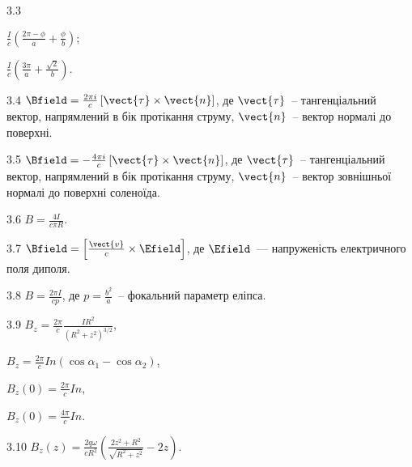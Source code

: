 \protect \section *{\protect {}}
\begin{Solution}{3.{3}}
	\begin{enumerate*}[label = \alph*)]
		\item $\frac{I}{c} \left( \frac{2\pi - \phi}{a}  + \frac{\phi}{b}\right) $;
		\item $\frac{I}{c} \left( \frac{3\pi}{a}  + \frac{\sqrt2}{b}\right) $.
	\end{enumerate*}
\end{Solution}
\begin{Solution}{3.{4}}
	$\Bfield = \frac{2\pi i }{c} \left[ \vect{\tau}\times\vect{n}\right] $, де $\vect{\tau}$~-- тангенціальний вектор, напрямлений в бік протікання струму, $\vect{n}$~-- вектор нормалі до поверхні.
\end{Solution}
\begin{Solution}{3.{5}}
			$\Bfield = - \frac{4\pi i }{c} \left[ \vect{\tau}\times\vect{n}\right] $, де $\vect{\tau}$~-- тангенціальний вектор, напрямлений в бік протікання струму, $\vect{n}$~-- вектор зовнішньої нормалі до поверхні соленоїда.
	
\end{Solution}
\begin{Solution}{3.{6}}
	$B = \frac{4I}{c\pi R}$.
\end{Solution}
\begin{Solution}{3.{7}}
	$\Bfield = \left[ \frac{\vect{v}}{c}\times\Efield\right]  $, де $\Efield$~--- напруженість електричного поля диполя.
\end{Solution}
\begin{Solution}{3.{8}}
	$B = \frac{2\pi I}{cp}$, де $p = \frac{b^2}{a}$~-- фокальний параметр еліпса.
\end{Solution}
\begin{Solution}{3.{9}}
	$B_z = \frac{2\pi}{c}\frac{I R^2}{(R^2 + z^2)^{3/2}}$,
	\begin{enumerate*}[label=\alph*)]
		\item $B_z = \frac{2\pi}{c} In (\cos\alpha_1 - \cos\alpha_2)$,
		\item $B_z(0) = \frac{2\pi}{c} In$,
		\item $B_z(0) = \frac{4\pi}{c} In$.
	\end{enumerate*}
\end{Solution}
\begin{Solution}{3.{10}}
	$B_z(z) = \frac{2q\omega}{cR^2}\left(\frac{2z^2 + R^2}{\sqrt{R^2 + z^2}} - 2z\right)$.
\end{Solution}
